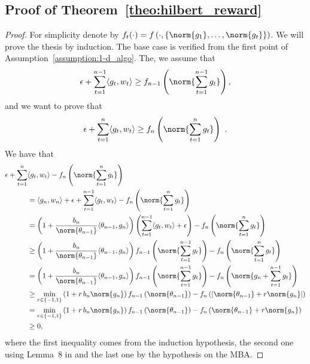 \subsection{Proof of Theorem~\ref{theo:hilbert_reward}}
\begin{proof}
  For simplicity denote by $f_t(\cdot)=f\left(\cdot, \{\norm{g_1}, \ldots, \norm{g_t}\}\right)$.
  We will prove the thesis by induction. The base case is verified from the first point of Assumption~\ref{assumption:1-d_algo}. The, we assume that 
  \[
  \epsilon + \sum_{t=1}^{n-1} \langle g_t, w_t \rangle \geq f_{n-1}\left( \norm{\sum_{t=1}^{n-1} g_t}\right),
  \]
  and we want to prove that 
  \[
  \epsilon + \sum_{t=1}^{n} \langle g_t, w_t \rangle \geq f_{n}\left( \norm{\sum_{t=1}^{n} g_t}\right)~.
  \]
  We have that
  \begin{align*}
  \epsilon + \sum_{t=1}^{n} &\langle g_t, w_t \rangle - f_n\left( \norm{\sum_{t=1}^{n} g_t}\right) \\
  &= \langle g_n, w_n \rangle + \epsilon + \sum_{t=1}^{n-1} \langle g_t, w_t \rangle - f_n\left( \norm{\sum_{t=1}^{n} g_t}\right)\\
  &= \left(1+\frac{b_n}{\norm{\theta_{n-1}}}\langle \theta_{n-1},g_n \rangle \right)\left(\sum_{t=1}^{n-1} \langle g_t, w_t \rangle +\epsilon \right) - f_n\left( \norm{\sum_{t=1}^{n} g_t}\right)\\
  &\geq \left(1+\frac{b_n}{\norm{\theta_{n-1}}}\langle \theta_{n-1},g_n \rangle \right) f_{n-1}\left( \norm{\sum_{t=1}^{n-1} g_t}\right) - f_n\left( \norm{\sum_{t=1}^{n} g_t}\right)\\
  &= \left(1+\frac{b_n}{\norm{\theta_{n-1}}}\langle \theta_{n-1},g_n \rangle \right) f_{n-1}\left( \norm{\sum_{t=1}^{n-1} g_t}\right) - f_n\left( \norm{g_n + \sum_{t=1}^{n-1} g_t}\right)\\
  &\geq \min_{r\in \{-1,1\}} \left(1+ r\, b_n \norm{g_n} \right) f_{n-1}\left( \norm{\theta_{n-1}}\right) - f_n\left(\left| \norm{\theta_{n-1}} + r \norm{g_n}\right|\right)\\
  &= \min_{r\in \{-1,1\}} \left(1+ r\, b_n \norm{g_n} \right) f_{n-1}\left( \norm{\theta_{n-1}}\right) - f_n\left( \norm{\theta_{n-1}} + r \norm{g_n}\right)\\
  &\geq 0,
  \end{align*}
  where the first inequality comes from the induction hypothesis, the second one using Lemma~8 in \citet{McMahanO14} and the last one by the hypothesis on the \ac{MBA}.
\end{proof}


